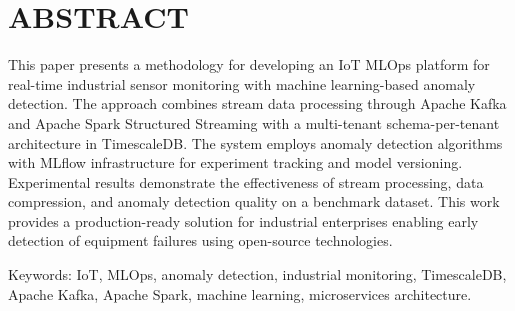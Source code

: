 \chapter*{ABSTRACT}

This paper presents a methodology for developing an IoT MLOps platform for real-time industrial sensor monitoring with machine learning-based anomaly detection. The approach combines stream data processing through Apache Kafka and Apache Spark Structured Streaming with a multi-tenant schema-per-tenant architecture in TimescaleDB. The system employs anomaly detection algorithms with MLflow infrastructure for experiment tracking and model versioning. Experimental results demonstrate the effectiveness of stream processing, data compression, and anomaly detection quality on a benchmark dataset. This work provides a production-ready solution for industrial enterprises enabling early detection of equipment failures using open-source technologies.

Keywords: IoT, MLOps, anomaly detection, industrial monitoring, TimescaleDB, Apache Kafka, Apache Spark, machine learning, microservices architecture.
